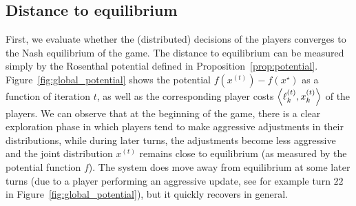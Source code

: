 \documentclass{sig-alternate-ipsn13}
\begin{document}
\subsection{Distance to equilibrium}
First, we evaluate whether the (distributed) decisions of the players converges to the Nash equilibrium of the game. The distance to equilibrium can be measured simply by the Rosenthal potential defined in Proposition~\ref{prop:potential}. Figure~\ref{fig:global_potential} shows the potential $f(x^{(t)}) - f(x^\star)$ as a function of iteration $t$, as well as the corresponding player costs $\left\langle \ell^{(t)}_k, x^{(t)}_k \right\rangle$ of the players. We can observe that at the beginning of the game, there is a clear exploration phase in which players tend to make aggressive adjustments in their distributions, while during later turns, the adjustments become less aggressive and the joint distribution $x^{(t)}$ remains close to equilibrium (as measured by the potential function $f$). The system does move away from equilibrium at some later turns (due to a player performing an aggressive update, see for example turn $22$ in Figure~\ref{fig:global_potential}), but it quickly recovers in general.



%
\end{document}
